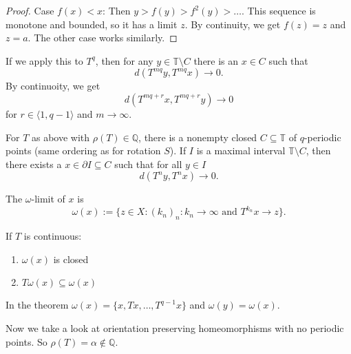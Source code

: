 \documentclass{article}
\newcommand*{\Q}{\mathbb{Q}}
\newcommand*{\T}{\mathbb{T}}
\newcommand*{\jbr}[1]{{\langle #1 \rangle}}
\newcommand*{\limn}{\lim_{n\to\infty}}
\begin{document}

\begin{proof}
    Case $f(x) < x$: Then $y>f(y)>f^2(y)>\dots$. This sequence is monotone and bounded, so it has a limit $z$. By continuity, we get $f(z) = z$ and $z=a$. The other case works similarly.
\end{proof}

If we apply this to $T^q$, then for any $y\in\T\setminus C$ there is an $x\in C$ such that
$$d(T^{mq}y,T^{mq}x)\to0.$$
By continuoity, we get
$$d(T^{mq+r}x,T^{mq+r}y)\to0$$
for $r\in\jbr{1,q-1}$ and $m\to\infty$.

\begin{thm}
    For $T$ as above with $\rho(T)\in\Q$, there is a nonempty closed $C\subseteq \T$ of $q$-periodic points (same ordering as for rotation $S$). If $I$ is a maximal interval $\T\setminus C$, then there exists a $x\in \partial I\subseteq C$ such that for all $y\in I$
    $$d(T^ny,T^nx)\to0.$$
\end{thm}

\begin{rec}
    The $\omega$-limit of $x$ is
    $$\omega(x):=\{z\in X: (k_n)_n: k_n\to\infty \text{ and } T^{k_n}x\to z\}.$$
\end{rec}

\begin{hw}
    If $T$ is continuous:
    \begin{enumerate}
        \item $\omega(x)$ is closed

        \item $T\omega(x) \subseteq \omega(x)$
    \end{enumerate}
\end{hw}


\begin{exam}
    In the theorem $\omega(x)=\{x,Tx,\dots,T^{q-1}x\}$ and $\omega(y)=\omega(x)$.
\end{exam}

Now we take a look at orientation preserving homeomorphisms with no periodic points. So $\rho(T) = \alpha\notin\Q$.
\end{document}

